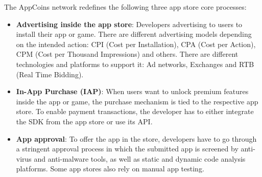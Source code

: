\medskip

The AppCoins network redefines the following three app store core processes:

\begin{itemize}
\item {\bf Advertising inside the app store}: Developers advertising to users to install their app or game. There are different advertising models depending on the intended action: CPI (Cost per Installation), CPA (Cost per Action), CPM (Cost per Thousand Impressions) and others. There are different technologies and platforms to support it: Ad networks, Exchanges and RTB (Real Time Bidding).
\item {\bf In-App Purchase (IAP)}: When users want to unlock premium features inside the app or game, the purchase mechanism is tied to the respective app store. To enable payment transactions, the developer has to either integrate the SDK from the app store or use its API.
\item {\bf App approval}: To offer the app in the store, developers have to go through a stringent approval process in which the submitted app is screened by anti-virus and anti-malware tools, as well as static and dynamic code analysis platforms. Some app stores also rely on manual app testing.
\end{itemize}


